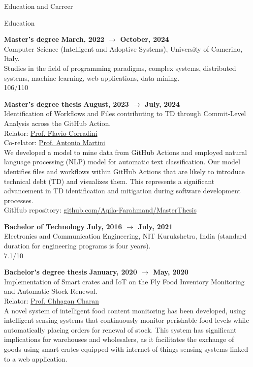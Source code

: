 \documentclass{resume} %
\begin{document}
\begin{rSection}{Education and Carreer}
\begin{rSubsection2}{Education}
            \item\textbf{ Master's degree }\hfill \textbf{March, 2022 $\rightarrow$ October, 2024}
            \\Computer Science (Intelligent and Adoptive Systems), University of Camerino, Italy.
            \\Studies in the field of programming paradigms, complex systems, distributed systems, machine learning, web applications, data mining.
            \\106/110
            \item\textbf{ Master's degree thesis }\hfill \textbf{August, 2023 $\rightarrow$ July, 2024}
            \\Identification of Workflows and Files contributing to TD through Commit-Level Analysis across the GitHub Action.
            \\Relator: \href{mailto:flavio.corradini@unicam.it}{Prof. Flavio Corradini}
            \\Co-relator: \href{mailto:antonima@ifi.uio.no}{Prof. Antonio Martini}
            \\We developed a model to mine data from GitHub Actions and employed natural language processing (NLP) model for automatic text classification.
            Our model identifies files and workflows within GitHub Actions that are likely to introduce technical debt (TD) and visualizes them.
            This represents a significant advancement in TD identification and mitigation during software development processes.
            \\GitHub repository: \href{https://github.com/Aqila-Farahmand/MasterThesis}{github.com/Aqila-Farahmand/MasterThesis}
            \item\textbf{ Bachelor of Technology }\hfill \textbf{July, 2016 $\rightarrow$ July, 2021}
            \\Electronics and Communication Engineering, NIT Kurukshetra, India (standard duration for engineering programs is four years).
            \\7.1/10
            \item\textbf{ Bachelor's degree thesis }\hfill \textbf{January, 2020 $\rightarrow$ May, 2020}
            \\Implementation of Smart crates and IoT on the Fly Food Inventory Monitoring and Automatic Stock Renewal.
            \\Relator: \href{mailto:chhagan.charan@nitkkr.ac.in}{Prof. Chhagan Charan}
            \\A novel system of intelligent food content monitoring has been developed, using intelligent sensing systems that continuously monitor perishable food levels while automatically placing orders for renewal of stock.
            This system has significant implications for warehouses and wholesalers, as it facilitates the exchange of goods using smart crates equipped with internet-of-things sensing systems linked to a web application.
        \end{rSubsection2}


\end{rSection}
\end{document}
